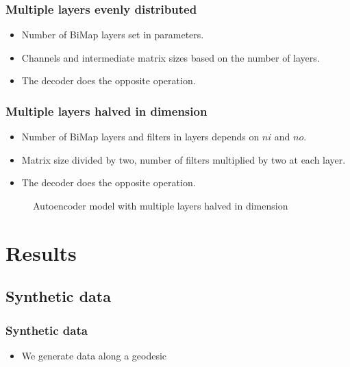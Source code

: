\documentclass{beamer}
\begin{document}
\begin{frame}
\frametitle{Multiple layers evenly distributed}
\begin{itemize}
    \item Number of BiMap layers set in parameters.
    \item Channels and intermediate matrix sizes based on the number of layers.
    \item The decoder does the opposite operation.
\end{itemize}
\begin{center}
    {\tiny
    
    }
\end{center}
\end{frame}

\begin{frame}
\frametitle{Multiple layers halved in dimension}
\begin{itemize}
    \item Number of BiMap layers and filters in layers depends on $ni$ and $no$.
    \item Matrix size divided by two, number of filters multiplied by two at each layer.
    \item The decoder does the opposite operation.
\end{itemize}
\begin{figure}
    \centering
    {\tiny
    
    }
    \caption{Autoencoder model with multiple layers halved in dimension}
\end{figure}

\end{frame}

\section{Results}

\subsection{Synthetic data}
\begin{frame}
\frametitle{Synthetic data}
\begin{itemize}
    \item We generate data along a geodesic
\end{itemize}
\end{frame}

\end{document}

